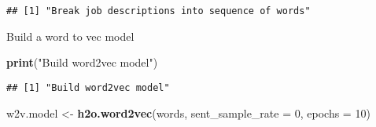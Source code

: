 \documentclass[]{article}
\newenvironment{Shaded}{\begin{snugshade}}{\end{snugshade}}
\newcommand{\KeywordTok}[1]{\textcolor[rgb]{0.13,0.29,0.53}{\textbf{{#1}}}}
\newcommand{\DataTypeTok}[1]{\textcolor[rgb]{0.13,0.29,0.53}{{#1}}}
\newcommand{\DecValTok}[1]{\textcolor[rgb]{0.00,0.00,0.81}{{#1}}}
\newcommand{\StringTok}[1]{\textcolor[rgb]{0.31,0.60,0.02}{{#1}}}
\newcommand{\NormalTok}[1]{{#1}}
\begin{document}
\begin{verbatim}
## [1] "Break job descriptions into sequence of words"
\end{verbatim}

\begin{Shaded}
\end{Shaded}

Build a word to vec model

\begin{Shaded}
\begin{Highlighting}[]
\KeywordTok{print}\NormalTok{(}\StringTok{"Build word2vec model"}\NormalTok{)}
\end{Highlighting}
\end{Shaded}

\begin{verbatim}
## [1] "Build word2vec model"
\end{verbatim}

\begin{Shaded}
\begin{Highlighting}[]
\NormalTok{w2v.model <-}\StringTok{ }\KeywordTok{h2o.word2vec}\NormalTok{(words, }\DataTypeTok{sent_sample_rate =} \DecValTok{0}\NormalTok{, }\DataTypeTok{epochs =} \DecValTok{10}\NormalTok{)}
\end{Highlighting}
\end{Shaded}
\end{document}
